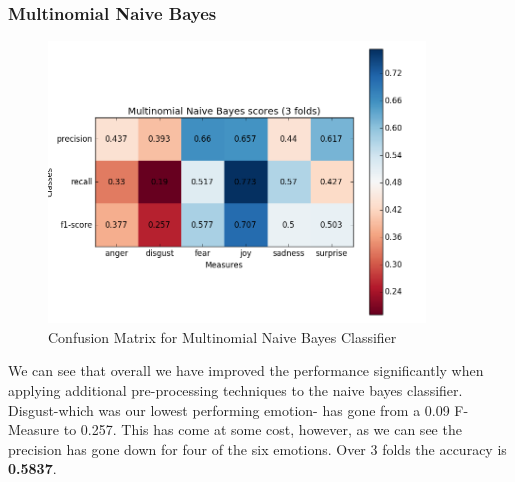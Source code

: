 \subsubsection{Multinomial Naive Bayes}

\begin{figure}[H]
\center
\includegraphics[width=10cm]{images/MNB_matrix.png}
\caption{Confusion Matrix for Multinomial Naive Bayes Classifier}
\end{figure}

We can see that overall we have improved the performance significantly when applying additional pre-processing techniques to the naive bayes classifier. Disgust-which was our lowest performing emotion- has gone from a 0.09 F-Measure to 0.257. This has come at some cost, however, as we can see the precision has gone down for four of the six emotions. Over 3 folds the accuracy is \textbf{0.5837}.


